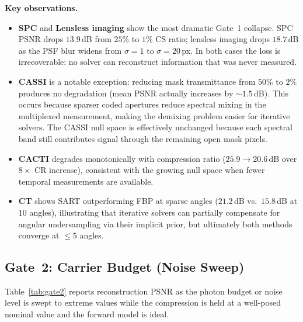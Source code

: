 \documentclass[11pt]{article}
\begin{document}
\noindent\textbf{Key observations.}
\begin{itemize}
  \item \textbf{SPC} and \textbf{Lensless imaging} show the most dramatic Gate~1 collapse.
    SPC PSNR drops $13.9$\,dB from $25$\% to $1$\% CS ratio; lensless imaging drops
    $18.7$\,dB as the PSF blur widens from $\sigma{=}1$ to $\sigma{=}20$\,px.
    In both cases the loss is irrecoverable: no solver can reconstruct
    information that was never measured.
  \item \textbf{CASSI} is a notable exception: reducing mask transmittance from
    $50$\% to $2$\% produces no degradation (mean PSNR actually increases by
    ${\sim}1.5$\,dB). This occurs because sparser coded apertures reduce
    spectral mixing in the multiplexed measurement, making the
    demixing problem easier for iterative solvers.  The CASSI null space
    is effectively unchanged because each spectral band still contributes
    signal through the remaining open mask pixels.
  \item \textbf{CACTI} degrades monotonically with compression ratio
    ($25.9 \to 20.6$\,dB over $8\times$ CR increase), consistent with the
    growing null space when fewer temporal measurements are available.
  \item \textbf{CT} shows SART outperforming FBP at sparse angles
    ($21.2$\,dB vs.\ $15.8$\,dB at 10 angles), illustrating that iterative
    solvers can partially compensate for angular undersampling via their
    implicit prior, but ultimately both methods converge at $\leq 5$ angles.
\end{itemize}


\subsection{Gate~2: Carrier Budget (Noise Sweep)}

Table~\ref{tab:gate2} reports reconstruction PSNR as the photon budget
or noise level is swept to extreme values while the compression is held
at a well-posed nominal value and the forward model is ideal.
\end{document}
